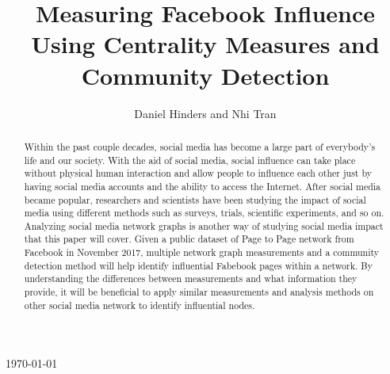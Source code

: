 \documentclass[11pt,twocolumn]{article}
\begin{document}
\begin{titlepage}
    
    
    \vfill\vfill\vfill %
    
    {\large\today} %
    
    
     
    
    \vfill %
    
\end{titlepage}

\title{Measuring Facebook Influence Using Centrality Measures and Community Detection}
\author{Daniel Hinders and Nhi Tran}
\maketitle
\begin{abstract}
Within the past couple decades, social media has become a large part of everybody's life and our society. With the aid of social media, social influence can take place without physical human interaction and allow people to influence each other just by having social media accounts and the ability to access the Internet. After social media became popular, researchers and scientists have been studying the impact of social media using different methods such as surveys, trials, scientific experiments, and so on. Analyzing social media network graphs is another way of studying social media impact that this paper will cover. Given a public dataset of Page to Page network from Facebook in November 2017, multiple network graph measurements and a community detection method will help identify influential Fabebook pages within a network. By understanding the differences between measurements and what information they provide, it will be beneficial to apply similar measurements and analysis methods on other social media network to identify influential nodes.\end{abstract}
\end{document}
